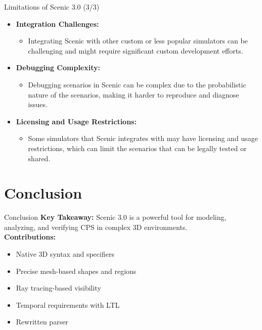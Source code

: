 \documentclass[10pt]{beamer}
\begin{document}
\begin{frame}{Limitations of Scenic 3.0 (3/3)}
  \begin{itemize}
    \item \textbf{Integration Challenges:} 
    \begin{itemize}
      \item Integrating Scenic with other custom or less popular simulators can be challenging and might require significant custom development efforts.
    \end{itemize}
    \item \textbf{Debugging Complexity:} 
    \begin{itemize}
      \item Debugging scenarios in Scenic can be complex due to the probabilistic nature of the scenarios, making it harder to reproduce and diagnose issues.
    \end{itemize}
    \item \textbf{Licensing and Usage Restrictions:} 
    \begin{itemize}
      \item Some simulators that Scenic integrates with may have licensing and usage restrictions, which can limit the scenarios that can be legally tested or shared.
    \end{itemize}
  \end{itemize}
\end{frame}

\section{Conclusion}

\begin{frame}{Conclusion}
    \textbf{Key Takeaway:} Scenic 3.0 is a powerful tool for modeling, analyzing, and verifying CPS in complex 3D environments.\\
    \textbf{Contributions:}
    \begin{itemize}
        \item Native 3D syntax and specifiers
        \item Precise mesh-based shapes and regions
        \item Ray tracing-based visibility
        \item Temporal requirements with LTL
        \item Rewritten parser
    \end{itemize}
\end{frame}
\end{document}

